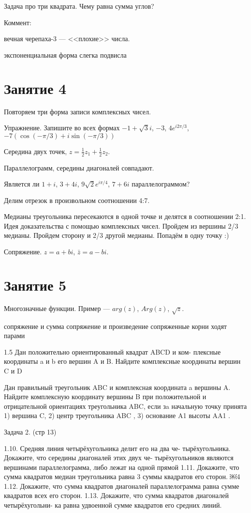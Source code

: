 \documentclass[12pt,a4paper]{article}
\begin{document}
Задача про три квадрата. Чему равна сумма углов?




Коммент: 

вечная черепаха-3 --- <<плохие>> числа.

экспоненциальная форма слегка подвисла


\section{Занятие 4}

Повторяем три форма записи комплексных чисел.

Упражнение. Запишите во всех формах $-1+\sqrt{3}i$, $-3$, $4e^{i2\pi/3}$, $-7(\cos (-\pi/3)+i\sin(-\pi/3))$

Середина двух точек, $z=\frac{1}{2}z_1+\frac{1}{2}z_2$.

Параллелограмм, середины диагоналей совпадают.

Является ли $1+i$, $3+4i$, $9\sqrt{2}e^{i\pi/4}$, $7+6i$ параллелограммом?

Делим отрезок в произвольном соотношении 4:7.

Медианы треугольника пересекаются в одной точке и делятся в соотношении 2:1. Идея доказательства с помощью комплексных чисел. Пройдем из вершины 2/3 медианы. Пройдем сторону и 2/3 другой медианы. Попадём в одну точку :)


Сопряжение. $z=a+bi$, $\bar{z}=a-bi$.

\section{Занятие 5}


Многозначные функции. Пример --- $arg(z)$, $Arg(z)$, $\sqrt{z}$. 

сопряжение и сумма
сопряжение и произведение
сопряженные корни ходят парами

1.5 Дан положительно ориентированный квадрат ABCD и ком- плексные координаты a и b его вершин A и B. Найдите комплексные координаты вершин C и D

Дан правильный треугольник ABC и комплексная координата a вершины A. Найдите комплексную координату вершины B при положительной и отрицательной ориентациях треугольника ABC, если зa начальную точку принята 1) вершина C, 2) центр треугольника ABC , 3) основание A1 высоты AA1 .

Задача 2. (стр 13)

1.10. Средняя линия четырёхугольника делит его на два че- тырёхугольника. Докажите, что середины диагоналей этих двух че- тырёхугольников являются вершинами параллелограмма, либо лежат на одной прямой
1.11. Докажите, что сумма квадратов медиан треугольника равна 3 суммы квадратов его сторон.
￼4
1.12. Докажите, что сумма квадратов диагоналей параллелограмма
равна сумме квадратов всех его сторон.
1.13. Докажите, что сумма квадратов диагоналей четырёхугольни-
ка равна удвоенной сумме квадратов его средних линий.
\end{document}
